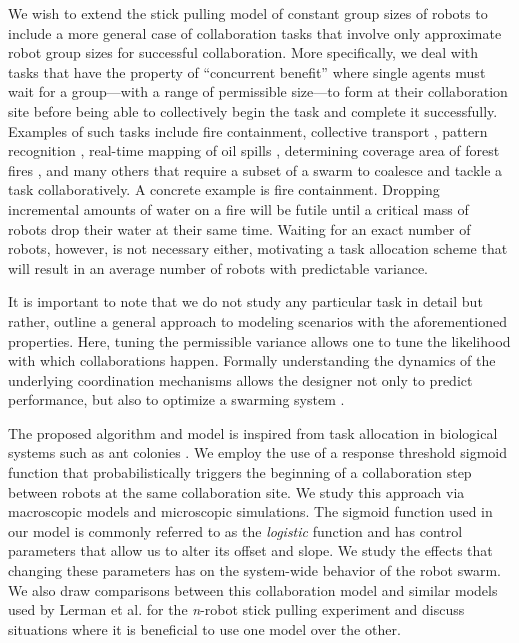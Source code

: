 \documentclass{TeXstyles/DARS/svmult}  %
\begin{document}
We wish to extend the stick pulling model of constant group sizes of robots to include a more general case of collaboration tasks that involve only approximate robot group sizes for successful collaboration. More specifically, we deal with tasks that have the property of ``concurrent benefit'' where single agents must wait for a group---with a range of permissible size---to form at their collaboration site before being able to collectively begin the task and complete it successfully. Examples of such tasks include fire containment, collective transport \cite{sugawara2012}, pattern recognition \cite{beni1993swarm}, real-time mapping of oil spills \cite{beni2005swarm}, determining coverage area of forest fires \cite{krishnanand2006glowworm}, and many others that require a subset of a swarm to coalesce and tackle a task collaboratively.  
A concrete example is fire containment. Dropping incremental amounts of water on a fire will be futile until a critical mass of robots drop their water at their same time. Waiting for an exact number of robots, however, is not necessary either, motivating a task allocation scheme that will result in an average number of robots with predictable variance. 

It is important to note that we do not study any particular task in detail but rather, outline a general approach to modeling scenarios with the aforementioned properties. Here, tuning the permissible variance allows one to tune the likelihood with which collaborations happen. Formally understanding the dynamics of the underlying coordination mechanisms allows the designer not only to predict performance, but also to optimize a swarming system \cite{Correll2008}.  

The proposed algorithm and model is inspired from task allocation in biological systems such as ant colonies \cite{Bonabeau1999,Krieger2000}. We employ the use of a response threshold sigmoid function that probabilistically triggers the beginning of a collaboration step between robots at the same collaboration site. We study this approach via macroscopic models and microscopic simulations. The sigmoid function used in our model is commonly referred to as the \emph{logistic} function and has control parameters that allow us to alter its offset and slope. We study the effects that changing these parameters has on the system-wide behavior of the robot swarm. We also draw comparisons between this collaboration model and similar models used by Lerman et al. for the \emph{n}-robot stick pulling experiment \cite{Lerman2001} and discuss situations where it is beneficial to use one model over the other.
\end{document}
